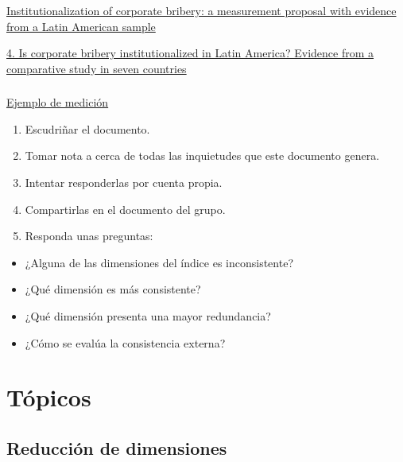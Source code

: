 \documentclass[
  letterpaper,
  DIV=11,
  numbers=noendperiod]{scrreprt}
\begin{document}
\href{https://www.emerald.com/insight/content/doi/10.1108/ARLA-04-2022-0099/full/html}{Institutionalization
of corporate bribery: a measurement proposal with evidence from a Latin
American sample}

\href{https://www.routledge.com/Organizational-Corruption-Crime-and-Covid-19-Upholding-Integrity-and-Transparency-in-Times-of-Crisis/Stachowicz-Stanusch-Amann-Hauser-Kleinhempel-Tripathi/p/book/9781032548845}{4.
Is corporate bribery institutionalized in Latin America? Evidence from a
comparative study in seven countries}

\subsection{}\label{section}

\href{642_analisis_factorial.docx}{Ejemplo de medición}

\begin{enumerate}
\def\labelenumi{\arabic{enumi}.}
\item
  Escudriñar el documento.
\item
  Tomar nota a cerca de todas las inquietudes que este documento genera.
\item
  Intentar responderlas por cuenta propia.
\item
  Compartirlas en el documento del grupo.
\item
  Responda unas preguntas:
\end{enumerate}

\begin{itemize}
\item
  ¿Alguna de las dimensiones del índice es inconsistente?
\item
  ¿Qué dimensión es más consistente?
\item
  ¿Qué dimensión presenta una mayor redundancia?
\item
  ¿Cómo se evalúa la consistencia externa?
\end{itemize}


\chapter{Tópicos}\label{tuxf3picos}

\section{Reducción de dimensiones}\label{reducciuxf3n-de-dimensiones}
\end{document}
